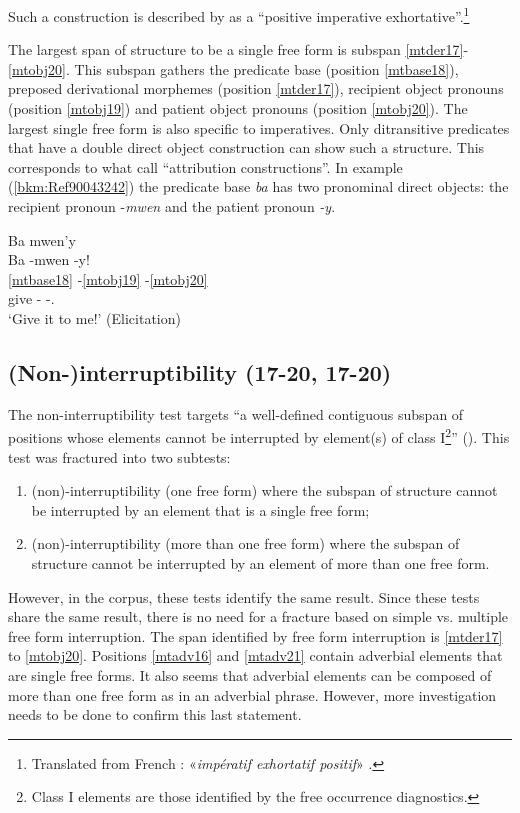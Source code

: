 \documentclass[output=paper]{langscibook}
\begin{document}
Such a construction is described by \citet[1:462]{Bernabe1983} as a ``positive imperative exhortative''.\footnote{Translated from French : «\textit{impératif exhortatif positif}» \citep[462]{Bernabe1983}.}

The largest span of structure to be a single free form is subspan \ref{mtder17}-\ref{mtobj20}. This subspan gathers the predicate base (position \ref{mtbase18}), preposed derivational morphemes (position \ref{mtder17}), recipient object pronouns (position \ref{mtobj19})  and patient object pronouns (position \ref{mtobj20}). The largest single free form is also specific to imperatives. Only ditransitive predicates that have a double direct object construction can show such a structure. This corresponds to what \citet[49]{PinalieBernabe1999} call ``attribution constructions''. In example (\ref{bkm:Ref90043242}) the predicate base \textit{ba} has two pronominal direct objects: the recipient pronoun -\textit{mwen} and the patient pronoun \textit{{}-y}.

\ea\label{bkm:Ref90043242}Ba mwen’y\\
\glll Ba -mwen -y!\\
 \ref{mtbase18} -\ref{mtobj19} -\ref{mtobj20} \\
give -\First\Sg{} -\Third\Sg.\Obj{}\\
\glt `Give it to me!' (Elicitation)
\z

\subsection{(Non-)interruptibility (17-20, 17-20)}

The non-interruptibility test targets “a well-defined contiguous subspan of positions whose elements cannot be interrupted by element(s) of class I\footnote{Class I elements are those identified by the free occurrence diagnostics.}'' (\citealt[16]{tallman2021constituency}). This test was fractured into two subtests:

\begin{enumerate}
\item (non)-interruptibility (one free form) where the subspan of structure cannot be interrupted by an element that is a single free form;
\item (non)-interruptibility (more than one free form) where the subspan of structure cannot be interrupted by an element of more than one free form.
\end{enumerate}

However, in the corpus, these tests identify the same result. Since these tests share the same result, there is no need for a fracture based on simple vs. multiple free form interruption. The span identified by free form interruption is  \ref{mtder17} to \ref{mtobj20}. Positions \ref{mtadv16} and \ref{mtadv21} contain adverbial elements that are single free forms. It also seems that adverbial elements can be composed of more than one free form as in an adverbial phrase. However, more investigation needs to be done to confirm this last statement.
\end{document}
